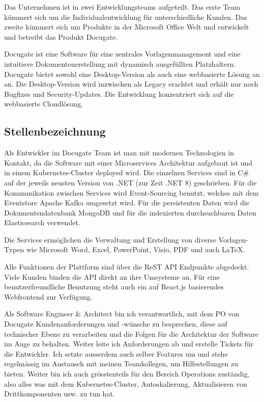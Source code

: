 \documentclass{bpraxis}
\begin{document}
Das Unternehmen ist in zwei Entwicklungsteams aufgeteilt. Das erste Team kümmert sich um die Individualentwicklung für unterschiedliche Kunden.
Das zweite kümmert sich um Produkte in der Microsoft Office Welt und entwickelt und betreibt das Produkt Docugate.

Docugate ist eine Software für eine zentrales Vorlagenmanagement und eine intuitieve Dokumentenerstellung mit dynamisch ausgefüllten Platzhaltern.
Docugate bietet sowohl eine Desktop-Version als auch eine webbasierte Lösung an an. Die Desktop-Version wird inzwischen als Legacy erachtet und erhält nur noch Bugfixes und Security-Updates.
Die Entwicklung konzentriert sich auf die webbasierte Cloudlösung.

\subsection{Stellenbezeichnung}

Als Entwickler im Docugate Team ist man mit modernen Technologien in Kontakt, da die Software mit einer Microservices Architektur aufgebaut ist und in einem Kubernetes-Cluster deployed wird.
Die einzelnen Services sind in C\# auf der jeweils neusten Version von .NET (zur Zeit .NET 8) geschrieben.
Für die Kommunikation zwischen Services wird Event-Sourcing benutzt, welches mit dem Eventstore Apache Kafka umgesetzt wird.
Für die persistenten Daten wird die Dokumentendatenbank MongoDB und für die indexierten durchsuchbaren Daten Elasticsearch verwendet.

Die Services ermöglichen die Verwaltung und Erstellung von diverse Vorlagen-Typen wie Microsoft Word, Excel, PowerPoint, Visio, PDF und auch LaTeX.

Alle Funktionen der Plattform sind über die ReST API Endpunkte abgedeckt. Viele Kunden binden die API direkt an ihre Umsysteme an.
Für eine benutzerfreundliche Benutzung steht auch ein auf React.js basierendes Webfrontend zur Verfügung.

Als Software Engineer \& Architect bin ich verantwortlich, mit dem PO von Docugate Kundenanforderungen und -wünsche zu besprechen, diese auf technischer Ebene zu verarbeiten und die Folgen für die
Architektur der Software im Auge zu behalten. Weiter leite ich Anforderungen ab und erstelle Tickets für die Entwickler. Ich setzte ausserdem auch selber Features um und stehe regelmässig im Austausch
mit meinen Teamkollegen, um Hilfestellungen zu bieten. Weiter bin ich auch grösstenteils für den Bereich Operations zuständig, also alles was mit dem Kubernetes-Cluster, Autoskalierung, Aktualisieren von
Drittkomponenten usw. zu tun hat.
\end{document}
